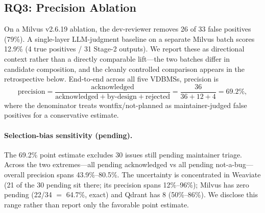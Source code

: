 \documentclass[sigconf, anonymous, review]{acmart}
\begin{document}
\subsection{RQ3: Precision Ablation}\label{sec:eval-rq3}
On a Milvus v2.6.19 ablation, the dev-reviewer removes 26 of 33 false positives (79\%). A single-layer LLM-judgment baseline on a separate Milvus batch scores 12.9\% (4 true positives / 31 Stage-2 outputs). We report these as directional context rather than a directly comparable lift---the two batches differ in candidate composition, and the cleanly controlled comparison appears in the retrospective below. End-to-end across all five VDBMSs, precision is
\[
\mathrm{precision} = \frac{\mathrm{acknowledged}}{\mathrm{acknowledged} + \mathrm{by\text{-}design} + \mathrm{rejected}} = \frac{36}{36+12+4} = 69.2\%,
\]
where the denominator treats wontfix/not-planned as maintainer-judged false positives for a conservative estimate.

\paragraph{Selection-bias sensitivity (pending).} The 69.2\% point estimate excludes 30 issues still pending maintainer triage. Across the two extremes---all pending acknowledged vs all pending not-a-bug---overall precision spans 43.9\%--80.5\%. The uncertainty is concentrated in Weaviate (21 of the 30 pending sit there; its precision spans 12\%--96\%); Milvus has zero pending (22/34 $=$ 64.7\%, exact) and Qdrant has 8 (50\%--86\%). We disclose this range rather than report only the favorable point estimate.
\end{document}
